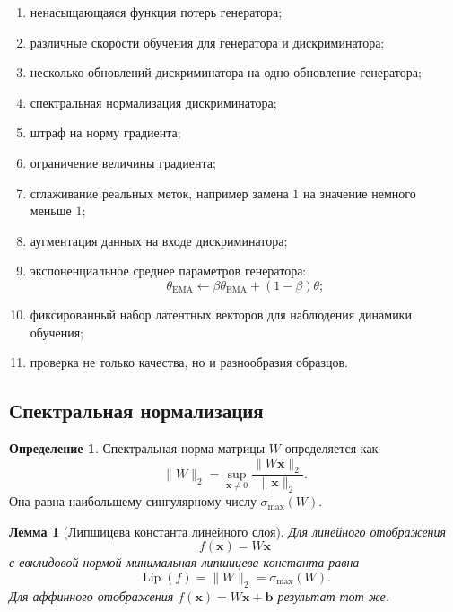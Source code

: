\documentclass[12pt,a4paper]{article}
\newcommand{\Lip}{\operatorname{Lip}}
\numberwithin{equation}{section}
\newtheorem{lemma}[theorem]{Лемма}
\theoremstyle{definition}
\newtheorem{definition}[theorem]{Определение}
\theoremstyle{remark}
\begin{document}
\begin{enumerate}
    \item ненасыщающаяся функция потерь генератора;

    \item различные скорости обучения для генератора и
    дискриминатора;

    \item несколько обновлений дискриминатора на одно обновление
    генератора;

    \item спектральная нормализация дискриминатора;

    \item штраф на норму градиента;

    \item ограничение величины градиента;

    \item сглаживание реальных меток, например замена \(1\) на
    значение немного меньше \(1\);

    \item аугментация данных на входе дискриминатора;

    \item экспоненциальное среднее параметров генератора:
    \[
        \theta_{\mathrm{EMA}}
        \leftarrow
        \beta\theta_{\mathrm{EMA}}
        +(1-\beta)\theta;
    \]

    \item фиксированный набор латентных векторов для наблюдения
    динамики обучения;

    \item проверка не только качества, но и разнообразия образцов.
\end{enumerate}

\subsection{Спектральная нормализация}

\begin{definition}
Спектральная норма матрицы \(W\) определяется как
\[
    \|W\|_2
    =
    \sup_{\bm{x}\neq0}
    \frac{\|W\bm{x}\|_2}{\|\bm{x}\|_2}.
\]
Она равна наибольшему сингулярному числу
\(\sigma_{\max}(W)\).
\end{definition}

\begin{lemma}[Липшицева константа линейного слоя]
Для линейного отображения
\[
    f(\bm{x})=W\bm{x}
\]
с евклидовой нормой минимальная липшицева константа равна
\[
    \Lip(f)=\|W\|_2=\sigma_{\max}(W).
\]
Для аффинного отображения \(f(\bm{x})=W\bm{x}+\bm{b}\) результат тот
же.
\end{lemma}
\end{document}
